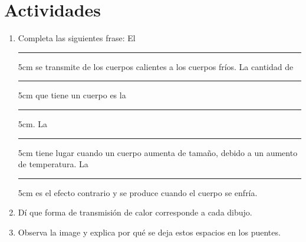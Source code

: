 \section*{Actividades}

\begin{enumerate}
\item{Completa las siguientes frase:
El \hrule{5cm} se transmite de los cuerpos calientes a los cuerpos fríos. 
La cantidad de \hrule{5cm} que tiene un cuerpo es la \hrule{5cm}.
La \hrule{5cm} tiene lugar cuando un cuerpo aumenta de tamaño, debido a un aumento de temperatura.
La \hrule{5cm} es el efecto contrario y se produce cuando el cuerpo se enfría.}

\item{Dí que forma de transmisión de calor corresponde a cada dibujo.}


\item{Observa la image y explica por qué se deja estos espacios en los puentes.}




\end{enumerate}